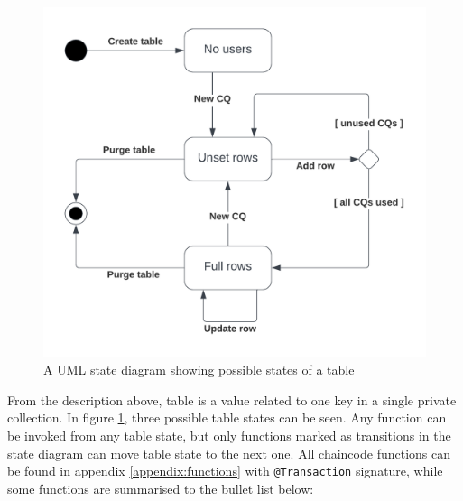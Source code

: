\documentclass[12pt]{article}
\begin{document}
    \begin{figure}[H]
        \includegraphics[width=\textwidth]{worldstate.png}
        \caption{A UML state diagram showing possible states of a table}
        \label{fig:worldstate}
    \end{figure}

    From the description above, table is a value related to one key in a single private collection. In figure \ref{fig:worldstate}, three possible table states can be seen. Any function can be invoked from any table state, but only functions marked as transitions in the state diagram can move table state to the next one. All chaincode functions can be found in appendix \ref{appendix:functions} with \lstinline{@Transaction} signature, while some functions are summarised to the bullet list below:
\end{document}
